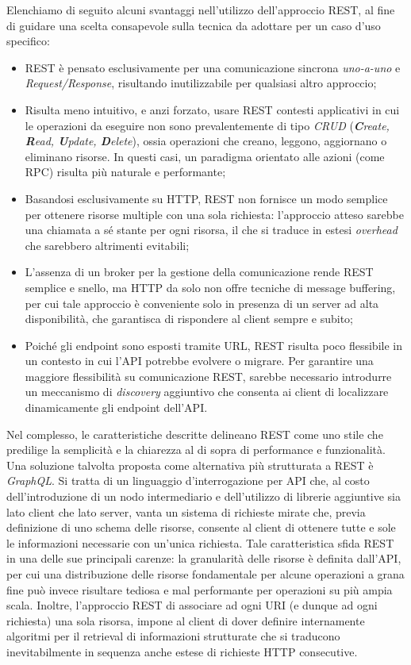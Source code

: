 Elenchiamo di seguito alcuni svantaggi nell'utilizzo dell'approccio REST, al fine di guidare una scelta consapevole sulla tecnica da adottare per un caso d'uso specifico:

\begin{itemize}
	\item REST è pensato esclusivamente per una comunicazione sincrona \emph{uno-a-uno} e \emph{Request/Response}, risultando inutilizzabile per qualsiasi altro approccio;
	\item Risulta meno intuitivo, e anzi forzato, usare REST contesti applicativi in cui le operazioni da eseguire non sono prevalentemente di tipo \emph{CRUD} (\emph{\textbf{C}reate, \textbf{R}ead, \textbf{U}pdate, \textbf{D}elete}), ossia operazioni che creano, leggono, aggiornano o eliminano risorse. In questi casi, un paradigma orientato alle azioni (come RPC) risulta più naturale e performante;
	\item Basandosi esclusivamente su HTTP, REST non fornisce un modo semplice per ottenere risorse multiple con una sola richiesta: l'approccio atteso sarebbe una chiamata a sé stante per ogni risorsa, il che si traduce in estesi \emph{overhead} che sarebbero altrimenti evitabili;
	\item L'assenza di un broker per la gestione della comunicazione rende REST semplice e snello, ma HTTP da solo non offre tecniche di message buffering, per cui tale approccio è conveniente solo in presenza di un server ad alta disponibilità, che garantisca di rispondere al client sempre e subito;
	\item Poiché gli endpoint sono esposti tramite URL, REST risulta poco flessibile in un contesto in cui l'API potrebbe evolvere o migrare. Per garantire una maggiore flessibilità su comunicazione REST, sarebbe necessario introdurre un meccanismo di \emph{discovery} aggiuntivo che consenta ai client di localizzare dinamicamente gli endpoint dell'API.
\end{itemize}

Nel complesso, le caratteristiche descritte delineano REST come uno stile che predilige la semplicità e la chiarezza al di sopra di performance e funzionalità.
Una soluzione talvolta proposta come alternativa più strutturata a REST è \emph{GraphQL}.
Si tratta di un linguaggio d'interrogazione per API che, al costo dell'introduzione di un nodo intermediario e dell'utilizzo di librerie aggiuntive sia lato client che lato server, vanta un sistema di richieste mirate che, previa definizione di uno schema delle risorse, consente al client di ottenere tutte e sole le informazioni necessarie con un'unica richiesta. Tale caratteristica sfida REST in una delle sue principali carenze: la granularità delle risorse è definita dall'API, per cui una distribuzione delle risorse fondamentale per alcune operazioni a grana fine può invece risultare tediosa e mal performante per operazioni su più ampia scala. Inoltre, l'approccio REST di associare ad ogni URI (e dunque ad ogni richiesta) una sola risorsa, impone al client di dover definire internamente algoritmi per il retrieval di informazioni strutturate che si traducono inevitabilmente in sequenza anche estese di richieste HTTP consecutive.

